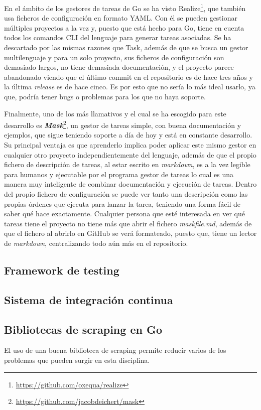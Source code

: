 En el ámbito de los gestores de tareas de Go se ha visto
Realize\footnote{\url{https://github.com/oxequa/realize}}, que también usa
ficheros de configuración en formato YAML. Con él se pueden gestionar múltiples
proyectos a la vez y, puesto que está hecho para Go, tiene en cuenta todos los
comandos CLI del lenguaje para generar tareas asociadas. Se ha descartado por
las mismas razones que Task, además de que se busca un gestor multilenguaje y
para un solo proyecto, sus ficheros de configuración son demasiado largos, no
tiene demasiada documentación, y el proyecto parece abandonado viendo que el
último commit en el repositorio es de hace tres años y la última
\textit{release} es de hace cinco. Es por esto que no sería lo más ideal usarlo,
ya que, podría tener bugs o problemas para los que no haya soporte.

Finalmente, uno de los más llamativos y el cual se ha escogido para este
desarrollo es
\textbf{\textit{Mask}}\footnote{\url{https://github.com/jacobdeichert/mask}}, un
gestor de tareas simple, con buena documentación y ejemplos, que sigue teniendo
soporte a día de hoy y está en constante desarrollo. Su principal ventaja es que
aprenderlo implica poder aplicar este mismo gestor en cualquier otro proyecto
independientemente del lenguaje, además de que el propio fichero de
descripción de tareas, al estar escrito en \textit{markdown}, es a la vez
legible para humanos y ejecutable por el programa gestor de tareas lo cual es
una manera muy inteligente de combinar documentación y ejecución de tareas.
Dentro del propio fichero de configuración se puede ver tanto una descripción
como las propias órdenes que ejecuta para lanzar la tarea, teniendo una forma
fácil de saber qué hace exactamente. Cualquier persona que esté interesada en
ver qué tareas tiene el proyecto no tiene más que abrir el fichero
\textit{maskfile.md}, además de que el fichero al abrirlo en GitHub se verá
formateado, puesto que, tiene un lector de \textit{markdown}, centralizando todo aún
más en el repositorio.

\subsection{Framework de testing}
\subsection{Sistema de integración continua}
\subsection{Bibliotecas de scraping en Go}
El uso de una buena biblioteca de scraping permite reducir varios de los
problemas que pueden surgir en esta disciplina.